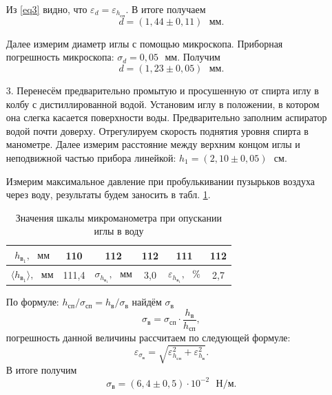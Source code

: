 \documentclass[a4paper, 12pt]{article}
\begin{document}
\begin{enumerate}
        Из \eqref{eq3} видно, что $\varepsilon_d = \varepsilon_{h_{сп}}$. В итоге получаем
        \begin{equation}
            d = (1,44 \pm 0,11) \text{ } мм.
        \end{equation}
        
        Далее измерим диаметр иглы с помощью микроскопа. Приборная погрешность микроскопа: $\sigma_d = 0,05 \text{ } мм$. Получим
        \begin{equation}
            d = (1,23 \pm 0,05) \text{ } мм.
        \end{equation}
        
        \item[3.] Перенесём предварительно промытую и просушенную от спирта иглу в колбу с дистиллированной водой. Установим иглу в положении, в котором она слегка касается поверхности воды. Предварительно заполним аспиратор водой почти доверху. Отрегулируем скорость поднятия уровня спирта в манометре. Далее измерим расстояние между верхним концом иглы и неподвижной частью прибора линейкой: $h_1 = (2,10 \pm 0,05) \text{ } см$. 
        
        Измерим максимальное давление при пробулькивании пузырьков воздуха через воду, результаты будем заносить в табл. \ref{table2}.
        
        \begin{table}[ht]
            \centering
            \begin{tabular}{|c|c|c|c|c|c|}
                \hline
                $h_{в_1}, \text{ } мм$ & 110 & 112 & 112 & 111 & 112 \\
                \hline
                $\langle h_{в_1} \rangle, \text{ } мм$ & 111,4 & $\sigma_{h_{в_1}}, \text{ } мм$ & 3,0 & $\varepsilon_{h_{в_1}}, \text{ } \%$ & 2,7 \\
                \hline
            \end{tabular}
            \caption{Значения шкалы микроманометра при опускании иглы в воду}
            \label{table2}
        \end{table}
        
        По формуле: $h_{сп} / \sigma_{сп} = h_в / \sigma_в$ найдём $\sigma_в$
        \begin{equation}
            \sigma_в = \sigma_{сп} \cdot \frac{h_в}{h_{сп}},
        \end{equation}
        погрешность данной величины рассчитаем по следующей формуле:
        \begin{equation}
            \varepsilon_{\sigma_в} = \sqrt{\varepsilon_{h_{сп}}^2 + \varepsilon_{h_в}^2}.
        \end{equation}
        В итоге получим
        \begin{equation}
            \sigma_в = (6,4 \pm 0,5) \cdot 10^{-2} \text{ } Н/м.
        \end{equation}
        

\end{enumerate}
\end{document}
